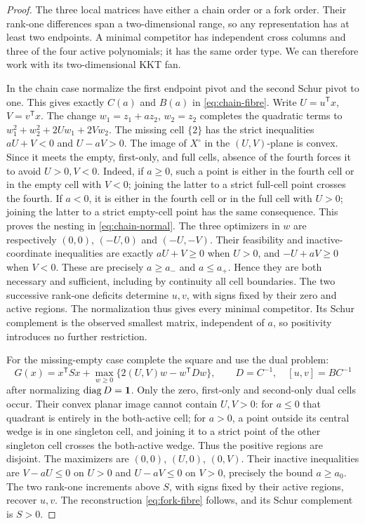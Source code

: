 \begin{proof}
The three local matrices have either a chain order or a fork order. Their
rank-one differences span a two-dimensional range, so any representation
has at least two endpoints. A minimal competitor has independent cross
columns and three of the four active polynomials; it has the same order
type. We can therefore work with its two-dimensional KKT fan.

In the chain case normalize the first endpoint pivot and the second Schur
pivot to one. This gives exactly $C(a)$ and $B(a)$ in
\eqref{eq:chain-fibre}. Write $U=u^{\mathsf T}x$, $V=v^{\mathsf T}x$.
The change $w_1=z_1+az_2$, $w_2=z_2$ completes the quadratic terms to
$w_1^2+w_2^2+2Uw_1+2Vw_2$. The missing cell $\{2\}$ has the strict
inequalities $aU+V<0$ and $U-aV>0$. The image of $X^\circ$ in the
$(U,V)$-plane is convex. Since it meets the empty, first-only, and full
cells, absence of the fourth forces it to avoid $U>0,V<0$.
Indeed, if $a\ge0$, such a point is either in the fourth cell or in the
empty cell with $V<0$; joining the latter to a strict full-cell point
crosses the fourth. If $a<0$, it is either in the fourth cell or in the
full cell with $U>0$; joining the latter to a strict empty-cell point has
the same consequence. This proves the nesting in \eqref{eq:chain-normal}.
The three optimizers in $w$ are respectively $(0,0)$, $(-U,0)$ and
$(-U,-V)$. Their feasibility and inactive-coordinate inequalities are
exactly $aU+V\ge0$ when $U>0$, and $-U+aV\ge0$ when $V<0$.
These are precisely $a\ge a_-$ and $a\le a_+$. Hence they are both
necessary and sufficient, including by continuity all cell boundaries.
The two successive rank-one deficits determine $u,v$, with signs fixed
by their zero and active regions. The normalization thus gives every
minimal competitor. Its Schur complement is the observed smallest matrix,
independent of $a$, so positivity introduces no further restriction.

For the missing-empty case complete the square and use the dual problem:
\[
 G(x)=x^{\mathsf T}Sx+
 \max_{w\ge0}\{2(U,V)w-w^{\mathsf T}Dw\},\qquad
 D=C^{-1},\quad [u,v]=BC^{-1}
\]
after normalizing $\operatorname{diag} D=\mathbf1$. Only the zero, first-only and
second-only dual cells occur. Their convex planar image cannot contain
$U,V>0$: for $a\le0$ that quadrant is entirely in the both-active cell;
for $a>0$, a point outside its central wedge is in one singleton cell,
and joining it to a strict point of the other singleton cell crosses the
both-active wedge. Thus the positive regions are disjoint. The maximizers
are $(0,0)$, $(U,0)$, $(0,V)$. Their inactive inequalities are
$V-aU\le0$ on $U>0$ and $U-aV\le0$ on $V>0$, precisely the bound $a\ge a_0$.
The two rank-one increments above $S$, with signs fixed by their active
regions, recover $u,v$. The reconstruction \eqref{eq:fork-fibre} follows,
and its Schur complement is $S>0$.


\end{proof}
